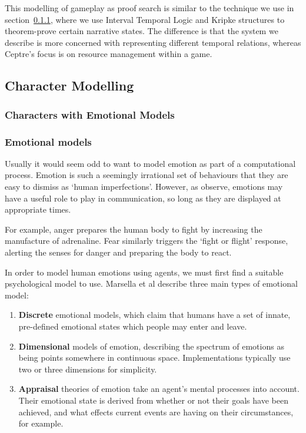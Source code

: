 This modelling of gameplay as proof search is similar to the technique we use in
section~\ref{}, where we use Interval Temporal Logic and Kripke structures to
theorem-prove certain narrative states. The difference is that the system we
describe is more concerned with representing different temporal relations,
whereas Ceptre's focus is on resource management within a game.


\subsection{Character Modelling}

\subsubsection{Characters with Emotional Models}

\subsubsection{Emotional models}\label{sec:emotional-models}
Usually it would seem odd to want to model emotion as part of a computational process. Emotion is such a seemingly irrational set of behaviours that they are easy to dismiss as `human imperfections'. However, as \citet{marsella2014} observe, emotions may have a useful role to play in communication, so long as they are displayed at appropriate times.

For example, anger prepares the human body to fight by increasing the manufacture of adrenaline. Fear similarly triggers the `fight or flight' response, alerting the senses for danger and preparing the body to react.

In order to model human emotions using agents, we must first find a suitable psychological model to use. Marsella et al describe three main types of emotional model:

\begin{enumerate}
 \item \textbf{Discrete} emotional models, which claim that humans have a set of innate, pre-defined emotional states which people may enter and leave.
 \item \textbf{Dimensional} models of emotion, describing the spectrum of emotions as being points somewhere in continuous space. Implementations typically use two or three dimensions for simplicity.
 \item \textbf{Appraisal} theories of emotion take an agent's mental processes into account. Their emotional state is derived from whether or not their goals have been achieved, and what effects current events are having on their circumstances, for example.
\end{enumerate}


